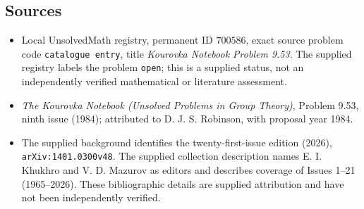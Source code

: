 \documentclass[11pt]{article}
\begin{document}
\subsection{Sources}
\begin{itemize}
\item Local UnsolvedMath registry, permanent ID \(700586\), exact source problem code \texttt{catalogue entry}, title \emph{Kourovka Notebook Problem 9.53}. The supplied registry labels the problem \texttt{open}; this is a supplied status, not an independently verified mathematical or literature assessment.
\item \emph{The Kourovka Notebook (Unsolved Problems in Group Theory)}, Problem 9.53, ninth issue (1984); attributed to D. J. S. Robinson, with proposal year 1984.
\item The supplied background identifies the twenty-first-issue edition (2026), \texttt{arXiv:1401.0300v48}. The supplied collection description names E. I. Khukhro and V. D. Mazurov as editors and describes coverage of Issues 1--21 (1965--2026). These bibliographic details are supplied attribution and have not been independently verified.
\end{itemize}
\end{document}
